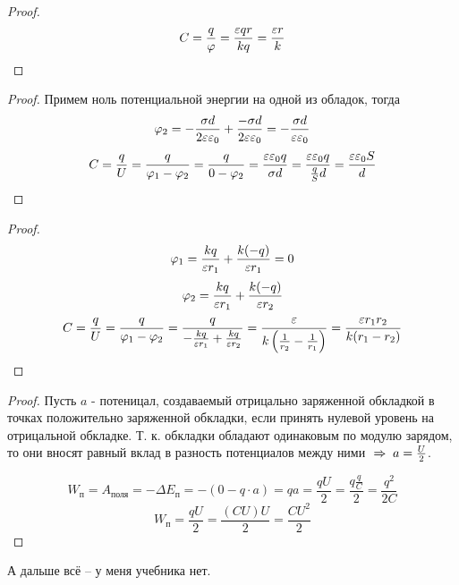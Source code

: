 \begin{proof}
	\[ C = \frac{q}{\varphi} = \frac{\varepsilon qr}{kq} = \frac{\varepsilon r}{k} \]
\end{proof}

\begin{proof}
	Примем ноль потенциальной энергии на одной из обладок, тогда
	\[ \varphi_2 = -\frac{\sigma d}{2 \varepsilon \varepsilon_0} + \frac{-\sigma d}{2 \varepsilon \varepsilon_0} = -\frac{\sigma d}{\varepsilon \varepsilon_0}\]
	\[ C = \frac{q}{U} = \frac{q}{\varphi_1 - \varphi_2} = \frac{q}{0 - \varphi_2} = \frac{\varepsilon \varepsilon_0 q}{\sigma d} = \frac{\varepsilon \varepsilon_0 q}{\frac{q}{S} d} = \frac{\varepsilon \varepsilon_0 S}{d} \]
\end{proof}

\begin{proof}
	\[ \varphi_1 = \frac{k q}{\varepsilon r_1} + \frac{k (-q)}{\varepsilon r_1} = 0 \]
	\[ \varphi_2 = \frac{k q}{\varepsilon r_1} + \frac{k (-q)}{\varepsilon r_2} \]
	\[ C = \frac{q}{U} = \frac{q}{\varphi_1 - \varphi_2} = \frac{q}{-\frac{k q}{\varepsilon r_1} + \frac{k q}{\varepsilon r_2}} = \frac{\varepsilon}{k \left( \frac{1}{r_2} - \frac{1}{r_1} \right)} = \frac{\varepsilon r_1 r_2}{k (r_1 - r_2)} \]
\end{proof}


\begin{proof}
	Пусть $a$ - потеницал, создаваемый отрицально заряженной обкладкой в точках положительно заряженной обкладки, если принять нулевой уровень на отрицальной обкладке. Т. к. обкладки обладают одинаковым по модулю зарядом, то они вносят равный вклад в разность потенциалов между ними $\;\Rightarrow\; a = \frac{U}{2}$.

	\[ W_\text{п} = A_\text{поля} = -\Delta E_\text{п} = -(0 - q \cdot a) = q a = \frac{qU}{2} = \frac{q \frac{q}{C}}{2} = \frac{q^2}{2C} \]
	\[ W_\text{п} = \frac{qU}{2} = \frac{(CU)U}{2} = \frac{CU^2}{2} \]
\end{proof}

А дальше всё -- у меня учебника нет.